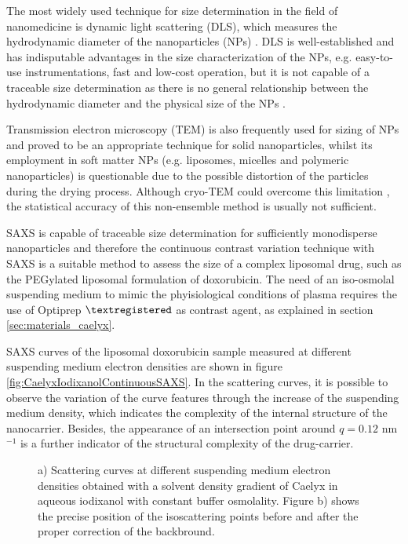 The most widely used technique for size determination in the field of nanomedicine is dynamic light scattering (DLS), which measures the hydrodynamic diameter of the nanoparticles (NPs) \cite{murphy_static_1997, hallett_vesicle_1991, egelhaaf_determination_1996, takahashi_precise_2008, jans_dynamic_2009, hoo_comparison_2008}. DLS is well-established and has indisputable advantages in the size characterization of the NPs, e.g. easy-to-use instrumentations, fast and low-cost operation, but it is not capable of a traceable size determination as there is no general relationship between the hydrodynamic diameter and the physical size of the NPs \cite{meli_traceable_2012}. 

Transmission electron microscopy (TEM) is also frequently used for sizing of NPs and proved to be an appropriate technique for solid nanoparticles, whilst its employment in soft matter NPs (e.g. liposomes, micelles and polymeric nanoparticles) is questionable due to the possible distortion of the particles during the drying process.  Although cryo-TEM could overcome this limitation \cite{li_doxorubicin_1998}, the statistical accuracy of this non-ensemble method is usually not sufficient.

SAXS is capable of traceable size determination for sufficiently monodisperse nanoparticles \cite{meli_traceable_2012} and therefore the continuous contrast variation technique with SAXS is a suitable method to assess the size of a complex liposomal drug, such as the PEGylated liposomal formulation of doxorubicin. The need of an iso-osmolal suspending medium to mimic the phyisiological conditions of plasma requires the use of Optiprep $\textregistered$ as contrast agent, as explained in section \ref{sec:materials_caelyx}.
 
SAXS curves of the liposomal doxorubicin sample measured at different suspending medium electron densities are shown in figure \ref{fig:CaelyxIodixanolContinuousSAXS}. In the scattering curves, it is possible to observe the variation of the curve features through the increase of the suspending medium density, which indicates the complexity of the internal structure of the nanocarrier. Besides, the appearance of an intersection point around $q = 0.12$ nm$^{-1}$ is a further indicator of the structural complexity of the drug-carrier.

\begin{figure}
	\centering
		\caption{ a) Scattering curves at different suspending medium electron densities obtained with a solvent density gradient of Caelyx in aqueous iodixanol with constant buffer osmolality. Figure b) shows the precise position of the isoscattering points before and after the proper correction of the backbround.}
\end{figure}

